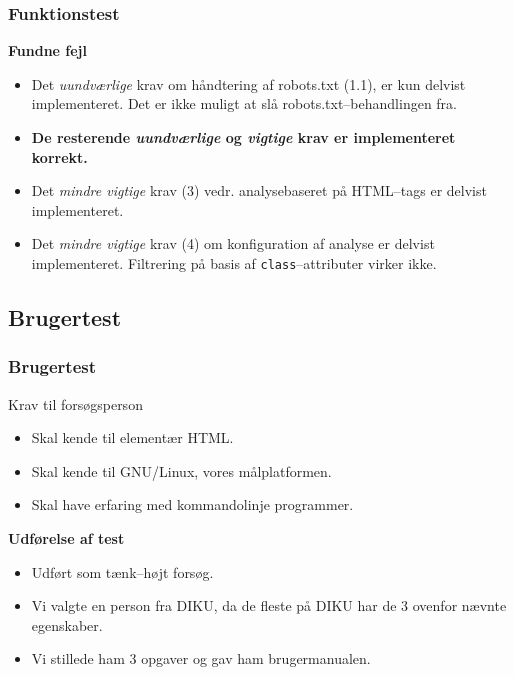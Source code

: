\documentclass{beamer}
\begin{document}
\begin{frame}
  \frametitle{Funktionstest}
  \textbf{Fundne fejl}
    \begin{itemize}
    \item Det \textit{uundværlige} krav om håndtering af robots.txt
      (1.1), er kun delvist implementeret. Det er ikke muligt at slå
      robots.txt--behandlingen fra.

    \item \textbf{De resterende \textit{uundværlige} og \textit{vigtige}
      krav er implementeret korrekt.}

    \item Det \textit{mindre vigtige} krav (3) vedr. analysebaseret på
      HTML--tags er delvist implementeret.

    \item Det \textit{mindre vigtige} krav (4) om konfiguration af
      analyse er delvist implementeret. Filtrering på basis af
      \texttt{class}--attributer virker ikke.
    \end{itemize}
\end{frame}


\subsection{Brugertest}
\begin{frame}
  \frametitle{Brugertest}

  \begin{block}{Krav til forsøgsperson}
    \begin{itemize}
    \item Skal kende til elementær HTML.
    \item Skal kende til GNU/Linux, vores målplatformen.
    \item Skal have erfaring med kommandolinje programmer.
    \end{itemize}
  \end{block}
\pause

\textbf{Udførelse af test}
  \begin{itemize}
  \item Udført som tænk--højt forsøg.
  \item Vi valgte en person fra DIKU, da de fleste på DIKU har de 3
    ovenfor nævnte egenskaber.
  \item Vi stillede ham 3 opgaver og gav ham brugermanualen.
  \end{itemize}
\end{frame}
\end{document}
